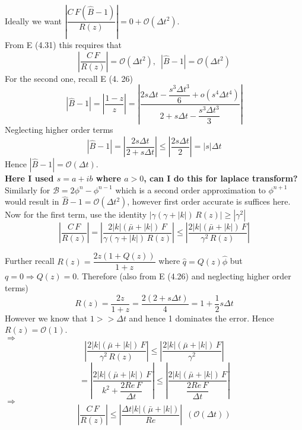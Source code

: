 Ideally we want $|\dfrac{C \, F(\hat{B} - 1)}{R(z)}| = 0 + \mathcal{O} (\Delta t^2)$.\\
From E (4.31) this requires that
\begin{equation*}
|\dfrac{C \, F}{R(z)}| = \mathcal{O} (\Delta t^2), \, \, \, | \hat{B} - 1| = \mathcal{O} (\Delta t^2)
\end{equation*}
For the second one, recall E (4. 26)
\begin{dmath*}
| \hat{B} - 1| = |\dfrac{1 - z}{z}| = | \dfrac{2 s \Delta t- \dfrac{s^3 \Delta t^3}{6} + o(s^4 \Delta t^4)}{2 + s \Delta t - \dfrac{s^3 \Delta t^3}{3}} |
\end{dmath*}
Neglecting higher order terms
\begin{dmath}
| \hat{B} - 1| = | \dfrac{2 s \Delta t}{2 + s \Delta t} |
\leq | \dfrac{2 s \Delta t}{2} | = |s| \Delta t
\end{dmath}
Hence $| \hat{B} - 1| = \mathcal{O} (\Delta t)$.\\
\textbf{Here I used $s = a + ib$ where $a>0$, can I do this for laplace transform?}\\

Similarly for $\mathcal{B} = 2 \phi^n - \phi^{n-1}$ which is a second order approximation to $\phi^{n+1}$ would result in $\hat{B} - 1 = \mathcal{O} (\Delta t^2)$, however first order accurate is suffices here.\\

Now for the first term, use the identity $| \gamma (\gamma + |k|) \, R(z) | \geqslant |\gamma^2|$
\begin{dmath*}
|\dfrac{C \, F}{R(z)}| = | \dfrac{2|k| (\bar{\mu} + |k|) \, F}{\gamma(\gamma + |k|) \, R(z)} |
\leq | \dfrac{2|k| (\bar{\mu} + |k|) \, F}{\gamma^2 \, R(z)} |
\end{dmath*}

Further recall $R(z) = \dfrac{2 z(1 + Q(z))}{1 + z}$ where $\hat{q} = Q(z)\hat{\phi}$ but $q = 0 \Rightarrow Q(z) = 0$. Therefore (also from E (4.26) and neglecting higher order terms)
\begin{equation}
R(z) = \dfrac{2 z}{1 + z} = \dfrac{2 (2 + s \Delta t)}{4} = 1 + \dfrac{1}{2} s \Delta t
\end{equation}
However we know that $1 >> \Delta t$ and hence 1 dominates the error. Hence $R(z) = \mathcal{O} (1)$.\\

$\Rightarrow$
\begin{equation}
| \dfrac{2|k| (\bar{\mu} + |k|) \, F}{\gamma^2 \, R(z)} | \leq | \dfrac{2|k| (\bar{\mu} + |k|) \, F}{\gamma^2}|
\end{equation}
\begin{equation*}
= |\dfrac{2|k| (\bar{\mu} + |k|) \, F}{k^2 + \dfrac{2 Re \, F}{\Delta t}}| 
\leq |\dfrac{2|k| (\bar{\mu} + |k|) \, F}{\dfrac{2 Re \, F}{\Delta t}}| 
\end{equation*}
$\Rightarrow$
\begin{dmath*}
|\dfrac{C \, F}{R(z)}| \leq |\dfrac{\Delta t |k| (\bar{\mu} + |k|)}{Re}| \, \, \, (\mathcal{O} (\Delta t))
\end{dmath*}

